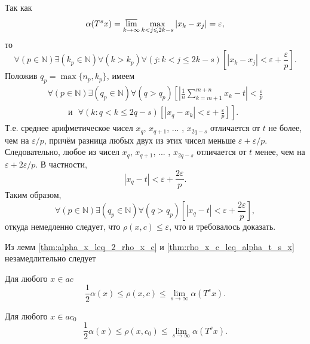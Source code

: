 Так как
\begin{equation}
	\alpha(T^s x) = \varlimsup_{k\to\infty} \max_{k<j\leq 2k-s} |x_k-x_j| = \varepsilon
	,
\end{equation}
то
\begin{equation}
	\forall(p\in\mathbb{N})
	\exists(k_p \in\mathbb{N})\forall(k>k_p)
	\forall(j: k< j \leq 2k-s)
	\left[
		|x_k - x_j|<\varepsilon + \frac{\varepsilon}{p}
	\right]
	.
\end{equation}
Положив $q_p = \max\{n_p, k_p\}$, имеем
\begin{multline}
	\forall(p\in\mathbb{N})
	\exists(q_p \in\mathbb{N})
	\forall(q>q_p)
	\left[
		\left|
			\frac{1}{n}\sum_{k=m+1}^{m+n} x_k
			-t
		\right|
		<\frac{\varepsilon}{p}
		\right.\\ \left. \phantom{\sum_0^0}
		\mbox{~~и~~}
		\forall(k:q<k \leq 2q-s)
		\left[
			|x_q - x_k|<\varepsilon + \frac{\varepsilon}{p}
		\right]
	\right]
	.
\end{multline}
Т.е. среднее арифметическое чисел $x_q$, $x_{q+1}$, ... , $x_{2q-s}$ отличается от $t$
не более, чем на $\varepsilon/p$, причём разница любых двух из этих чисел меньше $\varepsilon + \varepsilon/p$.
Следовательно, любое из чисел $x_q$, $x_{q+1}$, ... , $x_{2q-s}$
отличается от $t$ менее, чем на $\varepsilon + 2\varepsilon/p$.
В частности,
\begin{equation}
	|x_q - t| < \varepsilon + \frac{2\varepsilon}{p}
	.
\end{equation}
Таким образом,
\begin{equation}
	\forall(p\in\mathbb{N})
	\exists(q_p \in\mathbb{N})
	\forall(q>q_p)
	\left[
		|x_q - t| < \varepsilon + \frac{2\varepsilon}{p}
	\right]
	,
\end{equation}
откуда немедленно следует, что $\rho(x,c) \leq \varepsilon$,
что и требовалось доказать.

Из лемм \ref{thm:alpha_x_leq_2_rho_x_c} и \ref{thm:rho_x_c_leq_alpha_t_s_x}
незамедлительно следует
\begin{theorem}
\label{thm:rho_x_c_leq_alpha_t_s_x_united}
	Для любого $x\in ac$
	\begin{equation}
		\frac{1}{2} \alpha(x) \leq \rho(x,c)\leq \lim_{s\to\infty} \alpha(T^s x)
		.
	\end{equation}
\end{theorem}

\begin{corollary}
	Для любого $x\in ac_0$
	\begin{equation}
		\frac{1}{2} \alpha(x) \leq \rho(x,c_0)\leq \lim_{s\to\infty} \alpha(T^s x)
		.
	\end{equation}
\end{corollary}

